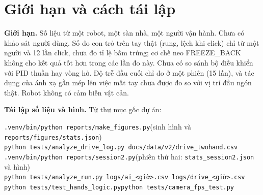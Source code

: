 \documentclass[11pt,a4paper]{article}
\newcommand{\code}[1]{\texttt{\small #1}}
\begin{document}
\section{Giới hạn và cách tái lập}
\textbf{Giới hạn.} Số liệu từ một robot, một sàn nhà, một người vận hành. Chưa có khảo sát người dùng. Số đo con trỏ trên tay thật (rung, lệch khi click) chỉ từ một người và 12 lần click, chưa đo tỉ lệ bấm trúng; cơ chế neo FREEZE\_BACK không cho kết quả tốt hơn trong các lần đo này. Chưa có so sánh bộ điều khiển với PID thuần hay vòng hở. Độ trễ đầu cuối chỉ đo ở một phiên (15 lần), và tác dụng của ánh xạ gần mép lên việc mất tay chưa được đo so với vị trí đầu ngón thật. Robot không có cảm biến vật cản.

\textbf{Tái lập số liệu và hình.} Từ thư mục gốc dự án:
\begin{center}\small
\code{.venv/bin/python reports/make\_figures.py}\quad (sinh hình và \code{reports/figures/stats.json})\\
\code{python tests/analyze\_drive\_log.py docs/data/v2/drive\_twohand.csv}\\
\code{.venv/bin/python reports/session2.py}\quad (phiên thứ hai: \code{stats\_session2.json} và hình)\\
\code{python tests/analyze\_run.py logs/ai\_<giờ>.csv logs/drive\_<giờ>.csv}\\
\code{python tests/test\_hands\_logic.py}\quad \code{python tests/camera\_fps\_test.py}
\end{center}
\end{document}
